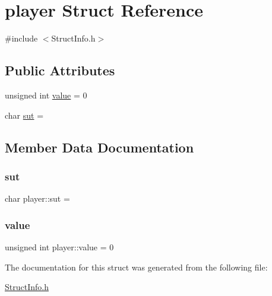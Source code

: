 \hypertarget{structplayer}{}\section{player Struct Reference}
\label{structplayer}


{\ttfamily \#include $<$Struct\+Info.\+h$>$}

\subsection*{Public Attributes}
\begin{DoxyCompactItemize}
\item 
unsigned int \hyperlink{structplayer_a16a403f59b795c914193b68929cd0166}{value} = 0
\item 
char \hyperlink{structplayer_a03b982fa21eada0b6d2772fb1efe57fa}{sut} = \textquotesingle{} \textquotesingle{}
\end{DoxyCompactItemize}


\subsection{Member Data Documentation}
\hypertarget{structplayer_a03b982fa21eada0b6d2772fb1efe57fa}{}\label{structplayer_a03b982fa21eada0b6d2772fb1efe57fa} 
\subsubsection{\texorpdfstring{sut}{sut}}
{\footnotesize\ttfamily char player\+::sut = \textquotesingle{} \textquotesingle{}}

\hypertarget{structplayer_a16a403f59b795c914193b68929cd0166}{}\label{structplayer_a16a403f59b795c914193b68929cd0166} 
\subsubsection{\texorpdfstring{value}{value}}
{\footnotesize\ttfamily unsigned int player\+::value = 0}



The documentation for this struct was generated from the following file\+:\begin{DoxyCompactItemize}
\item 
\hyperlink{_struct_info_8h}{Struct\+Info.\+h}\end{DoxyCompactItemize}
